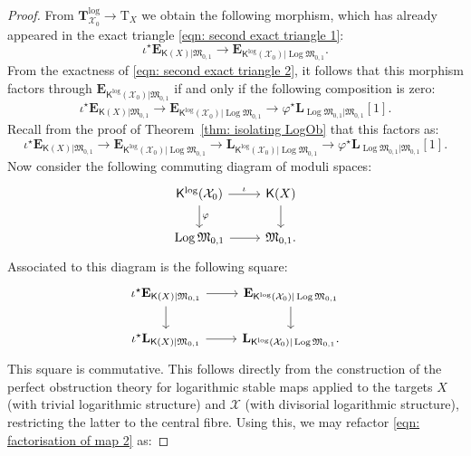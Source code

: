 \documentclass[11pt]{amsart}
\theoremstyle{definition}
\theoremstyle{definition}
\newcommand{\EE}{\mathbf{E}}
\newcommand{\LL}{\mathbf{L}}
\newcommand{\op}[1]{\operatorname{#1}}
\newcommand{\TTlog}{\mathbf{T}^{\op{log}}}
\newcommand{\T}{\mathrm{T}}
\newcommand{\Xcal}{\mathcal{X}}
\newcommand{\Mfrak}{\mathfrak{M}}
\newcommand{\Kup}{\mathsf{K}}
\newcommand{\Log}{\operatorname{Log}}
\begin{document}
\begin{proof}
From $\TTlog_{\Xcal_0} \to \T_X$ we obtain the following morphism, which has already appeared in the exact triangle \eqref{eqn: second exact triangle 1}:
\begin{equation*} \iota^\star \EE_{\Kup(X)|\Mfrak_{0,1}} \to \EE_{\Kup^{\log}(\Xcal_0)|\Log\Mfrak_{0,1}}.\end{equation*}
From the exactness of \eqref{eqn: second exact triangle 2}, it follows that this morphism factors through $\EE_{\Kup^{\log}(\Xcal_0)|\Mfrak_{0,1}}$ if and only if the following composition is zero:
\begin{equation*} \iota^\star \EE_{\Kup(X)|\Mfrak_{0,1}} \to \EE_{\Kup^{\log}(\Xcal_0)|\Log\Mfrak_{0,1}} \to \varphi^\star \LL_{\Log\Mfrak_{0,1}|\Mfrak_{0,1}}[1]. \end{equation*}
Recall from the proof of Theorem~\ref{thm: isolating LogOb} that this factors as:
\begin{equation} \label{eqn: factorisation of map 2} \iota^\star \EE_{\Kup(X)|\Mfrak_{0,1}} \to \EE_{\Kup^{\log}(\Xcal_0)|\Log\Mfrak_{0,1}} \to \LL_{\Kup^{\log}(\Xcal_0)|\Log\Mfrak_{0,1}} \to \varphi^\star \LL_{\Log\Mfrak_{0,1}|\Mfrak_{0,1}}[1]. \end{equation}
Now consider the following commuting diagram of moduli spaces:
\begin{equation} \label{eqn: moduli square in proof of obstruction bundle}
\begin{tikzcd}
\Kup^{\log}(\Xcal_0) \ar[r,"\iota"] \ar[d,"\varphi"] & \Kup(X) \ar[d] \\
\Log\Mfrak_{0,1} \ar[r] & \Mfrak_{0,1}.
\end{tikzcd}
\end{equation}
Associated to this diagram is the following square: 
\begin{equation} \label{eqn: obstruction theory square in proof of obstruction bundle}
\begin{tikzcd}
\iota^\star \EE_{\Kup(X)|\Mfrak_{0,1}} \ar[r] \ar[d] & \EE_{\Kup^{\log}(\Xcal_0)|\Log\Mfrak_{0,1}} \ar[d] \\
\iota^\star \LL_{\Kup(X)|\Mfrak_{0,1}} \ar[r] & \LL_{\Kup^{\log}(\Xcal_0)|\Log\Mfrak_{0,1}}.
\end{tikzcd}
\end{equation}
This square is commutative. This follows directly from the construction of the perfect obstruction theory for logarithmic stable maps \cite[\S 5]{GrossSiebertLog} applied to the targets $X$ (with trivial logarithmic structure) and $\Xcal$ (with divisorial logarithmic structure), restricting the latter to the central fibre. Using this, we may refactor \eqref{eqn: factorisation of map 2} as:

\end{proof}
\end{document}
